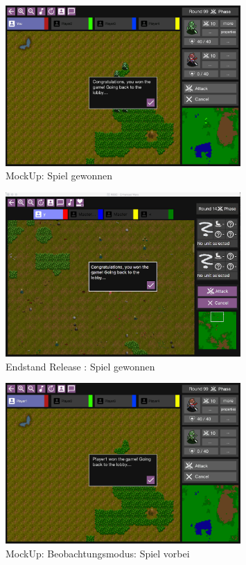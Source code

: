 \documentclass[12pt, titlepage]{scrartcl}
\newcommand{\RN}[1]{%
	\textup{\uppercase\expandafter{\romannumeral#1}}%
}
\begin{document}
				\begin{figure}[H] 
					\centering
					\includegraphics[width=0.8\textwidth]{images/mockUps/GameWon.png}
					\caption{MockUp: Spiel gewonnen}
					\label{Game_Won_2}
				\end{figure}
				\begin{figure}[H] 
					\centering
					\includegraphics[width=0.8\textwidth]{images/endOfRelease/GameWon.png}
					\caption{Endstand Release \RN{3}: Spiel gewonnen}
					\label{End_Game_Won}
				\end{figure}
				\begin{figure}[H] 
					\centering
					\includegraphics[width=0.8\textwidth]{images/mockUps/SpectatorEnd.png}
					\caption{MockUp: Beobachtungsmodus: Spiel vorbei}
					\label{Spectator_End_2}
				\end{figure}
\end{document}
